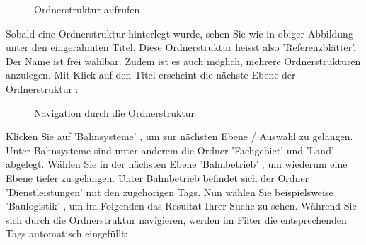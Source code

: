 \begin{figure}[H]
\caption{Ordnerstruktur aufrufen}
\end{figure}

Sobald eine Ordnerstruktur hinterlegt wurde, sehen Sie wie in obiger Abbildung unter  den eingerahmten Titel. Diese Ordnerstruktur heisst also 'Referenzblätter'. Der Name ist frei wählbar. Zudem ist es auch möglich, mehrere Ordnerstrukturen anzulegen. Mit Klick auf den Titel erscheint die nächste Ebene der Ordnerstruktur :

\begin{figure}[H]
\caption{Navigation durch die Ordnerstruktur}
\end{figure}

Klicken Sie auf 'Bahnsysteme' , um zur nächsten Ebene / Auswahl zu gelangen. Unter Bahnsysteme sind unter anderem die Ordner 'Fachgebiet' und 'Land' abgelegt. Wählen Sie in der nächsten Ebene 'Bahnbetrieb' , um wiederum eine Ebene tiefer zu gelangen. Unter Bahnbetrieb befindet sich der Ordner 'Dienstleistungen' mit den zugehörigen Tags. Nun wählen Sie beispielsweise 'Baulogistik' , um im Folgenden das Resultat Ihrer Suche zu sehen. Während Sie sich durch die Ordnerstruktur navigieren, werden im Filter die entsprechenden Tags automatisch eingefüllt:

